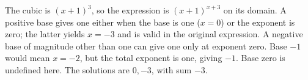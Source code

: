 The cubic is $(x+1)^3$, so the expression is $(x+1)^{x+3}$ on its domain. A positive base gives one either when the base is one ($x=0$) or the exponent is zero; the latter yields $x=-3$ and is valid in the original expression. A negative base of magnitude other than one can give one only at exponent zero. Base $-1$ would mean $x=-2$, but the total exponent is one, giving $-1$. Base zero is undefined here. The solutions are $0,-3$, with sum $\boxed{-3}$.
